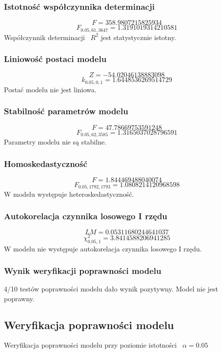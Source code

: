 \subsubsection{Istotność współczynnika determinacji}
\[F = 358.9807215825934\]
\[F_{0.05, 61, 3647} = 1.3191019314210581\]
Współczynnik determinacji ~$R^2$ jest statystycznie istotny.
\subsubsection{Liniowość postaci modelu}
\[Z = -54.02046138883098\]
\[k_{0.05, 0, 1} = 1.6448536269514729\]
Postać modelu nie jest liniowa.
\subsubsection{Stabilność parametrów modelu}
\[F = 47.78669753591248\]
\[F_{0.05, 62, 3585} = 1.3165037028796591\]
Parametry modelu nie są stabilne.
\subsubsection{Homoskedastyczność}
\[F = 1.844469488040074\]
\[F_{0.05, 1792, 1793} = 1.0808214120968598\]
W modelu występuje heteroskedastyczność.
\subsubsection{Autokorelacja czynnika losowego I rzędu}
\[LM = 0.05311680244641037\]
\[\chi^2_{0.05, 1} = 3.8414588206941285\]
W modelu nie występuje autokorelacja czynnika losowego I rzędu.
\subsubsection{Wynik weryfikacji poprawności modelu}
4/10 testów poprawności modelu dało wynik pozytywny. Model nie jest poprawny.
\subsection{Weryfikacja poprawności modelu}
Weryfikacja poprawności modelu przy poziomie istotności ~$\alpha = 0.05$
